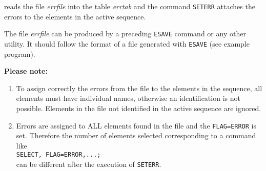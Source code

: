 reads the file {\it errfile} into the table {\it errtab} and the
command {\tt SETERR} attaches the errors to the elements in the active
sequence.  

The file {\it errfile} can be produced by a preceding {\tt ESAVE} command
or any other utility. It should follow the format of a file generated
with {\tt ESAVE} (see example program). 

{\bf Please note:}
\begin{enumerate}
   \item To assign correctly the errors from the file to the elements in
     the sequence, all elements must have individual names, otherwise an
     identification is not possible. Elements in the file not identified
     in the active sequence are ignored.  
   \item Errors are assigned to ALL elements found in the file and the
     {\tt FLAG=ERROR} is set. Therefore the number of elements selected
     corresponding to a command like
     \\ {\tt SELECT, FLAG=ERROR,...;}
     \\ can be different after the execution of {\tt SETERR}. 
\end{enumerate}


